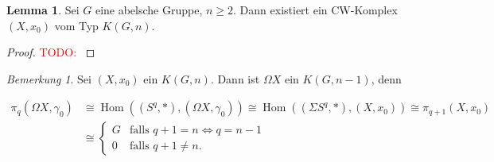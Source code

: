\documentclass[11pt, a4paper, german]{article}
\theoremstyle{definition}
\newtheorem*{lem}{Lemma}
\theoremstyle{remark}
\newtheorem*{bem}{Bemerkung}
\newcommand{\TODO}[1]{\textcolor{red}{TODO: #1}} %
\DeclareMathOperator{\Hom}{Hom} %
\begin{document}
\begin{lem}
  Sei $G$ eine abelsche Gruppe, $n \geq 2$.
  Dann existiert ein CW-Komplex $(X, x_0)$ vom Typ $K(G, n)$.
\end{lem}

\begin{proof}
  \TODO{}
\end{proof}



\begin{bem}
  Sei $(X, x_0)$ ein $K(G, n)$. Dann ist $\Omega X$ ein $K(G, n-1)$, denn

  \begin{align*}
    \pi_q(\Omega X, \gamma_0) & \cong \Hom((S^q, *), (\Omega X, \gamma_0))
    \cong \Hom((\Sigma S^q, *), (X, x_0))
    \cong \pi_{q+1}(X, x_0) \\
    & \cong \begin{cases}
      G & \text{falls $q+1 = n \iff q = n-1$} \\
      0 & \text{falls $q+1 \neq n$.}
    \end{cases}
  \end{align*}
\end{bem}


\end{document}
